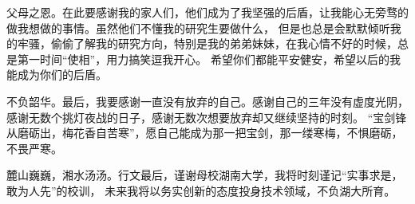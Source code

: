 \begin{acknowledgements}
	父母之恩。在此要感谢我的家人们，他们成为了我坚强的后盾，让我能心无旁骛的做我想做的事情。虽然他们不懂我的研究生要做什么，
	但是也总是会默默倾听我的牢骚，偷偷了解我的研究方向，特别是我的弟弟妹妹，在我心情不好的时候，总是第一时间“使相”，用力搞笑逗我开心。
	希望你们都能平安健安，希望以后的我能成为你们的后盾。

	不负韶华。最后，我要感谢一直没有放弃的自己。感谢自己的三年没有虚度光阴，感谢无数个挑灯夜战的日子，感谢无数次想要放弃却又继续坚持的时刻。
	“宝剑锋从磨砺出，梅花香自苦寒”，愿自己能成为那一把宝剑，那一缕寒梅，不惧磨砺，不畏严寒。

	麓山巍巍，湘水汤汤。行文最后，谨谢母校湖南大学，我将时刻谨记“实事求是，敢为人先”的校训，
	未来我将以务实创新的态度投身技术领域，不负湖大所育。

\end{acknowledgements}
